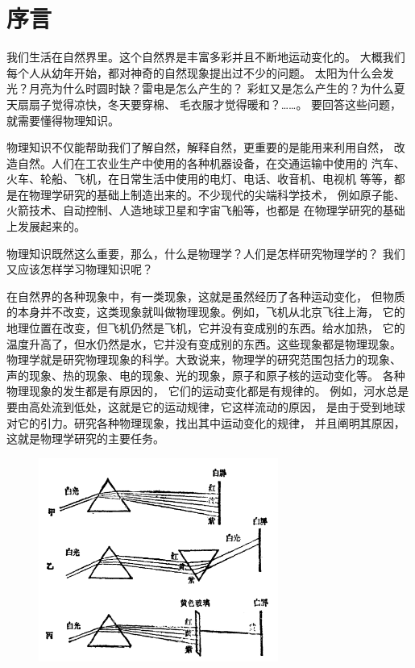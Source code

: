 
\chapter*{序言}

我们生活在自然界里。这个自然界是丰富多彩并且不断地运动变化的。
大概我们每个人从幼年开始，都对神奇的自然现象提出过不少的问题。
太阳为什么会发光？月亮为什么时圆时缺？雷电是怎么产生的？
彩虹又是怎么产生的？为什么夏天扇扇子觉得凉快，冬天要穿棉、
毛衣服才觉得暖和？……。 要回答这些问题，就需要懂得物理知识。

物理知识不仅能帮助我们了解自然，解释自然，更重要的是能用来利用自然，
改造自然。人们在工农业生产中使用的各种机器设备，在交通运输中使用的
汽车、火车、轮船、飞机，在日常生活中使用的电灯、电话、收音机、电视机
等等，都是在物理学研究的基础上制造出来的。不少现代的尖端科学技术，
例如原子能、火箭技术、自动控制、人造地球卫星和字宙飞船等，也都是
在物理学研究的基础上发展起来的。

物理知识既然这么重要，那么，什么是物理学？人们是怎样研究物理学的？
我们又应该怎样学习物理知识呢？

在自然界的各种现象中，有一类现象，这就是虽然经历了各种运动变化，
但物质的本身并不改变，这类现象就叫做物理现象。例如，飞机从北京飞往上海，
它的地理位置在改变，但飞机仍然是飞机，它并没有变成别的东西。给水加热，
它的温度升高了，但水仍然是水，它并没有变成别的东西。这些现象都是物理现象。
物理学就是研究物理现象的科学。大致说来，物理学的研究范围包括力的现象、
声的现象、热的现象、电的现象、光的现象，原子和原子核的运动变化等。
各种物理现象的发生都是有原因的， 它们的运动变化都是有规律的。
例如，河水总是要由高处流到低处，这就是它的运动规律，它这样流动的原因，
是由于受到地球对它的引力。研究各种物理现象，找出其中运动变化的规律，
并且阐明其原因，这就是物理学研究的主要任务。

\begin{figure}[htbp]
    \centering
    \includegraphics[width=0.7\textwidth]{../pic/czwl1-qy-1}
    \caption{}\label{fig:qy-1}
\end{figure}

